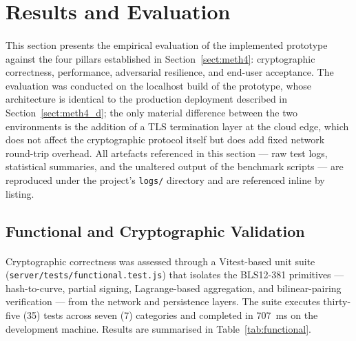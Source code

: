 \section{Results and Evaluation}
\label{header:results}

\paragraph{}This section presents the empirical evaluation of the implemented prototype against the four pillars established in Section~\ref{sect:meth4}: cryptographic correctness, performance, adversarial resilience, and end-user acceptance. The evaluation was conducted on the localhost build of the prototype, whose architecture is identical to the production deployment described in Section~\ref{sect:meth4_d}; the only material difference between the two environments is the addition of a TLS termination layer at the cloud edge, which does not affect the cryptographic protocol itself but does add fixed network round-trip overhead. All artefacts referenced in this section --- raw test logs, statistical summaries, and the unaltered output of the benchmark scripts --- are reproduced under the project's \texttt{logs/} directory and are referenced inline by listing.

\subsection{Functional and Cryptographic Validation}
\label{sect:results_func}

\paragraph{}Cryptographic correctness was assessed through a Vitest-based unit suite (\texttt{server/tests/functional.test.js}) that isolates the BLS12-381 primitives --- hash-to-curve, partial signing, Lagrange-based aggregation, and bilinear-pairing verification --- from the network and persistence layers. The suite executes thirty-five (35) tests across seven (7) categories and completed in 707~ms on the development machine. Results are summarised in Table~\ref{tab:functional}.

